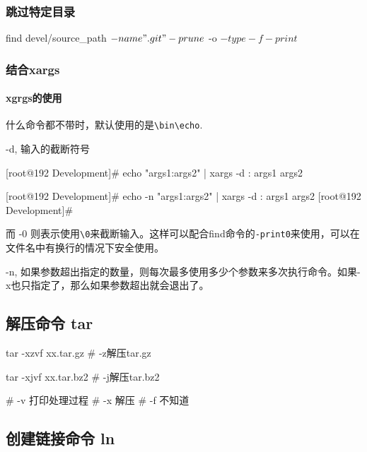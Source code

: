 \subsubsection{跳过特定目录}

\begin{Bash}[]

find devel/source_path \( -name ".git" -prune \) -o \( -type -f -print \)

\end{Bash}

\subsubsection{结合xargs}

\paragraph{xgrgs的使用}

什么命令都不带时，默认使用的是\lstinline$\bin\echo$.

-d, 输入的截断符号

\begin{Bash}

[root@192 Development]# echo "args1:args2" | xargs -d :
args1 args2

[root@192 Development]# echo -n "args1:args2" | xargs -d :
args1 args2
[root@192 Development]# 

\end{Bash}

而 -0 则表示使用\lstinline$\0$来截断输入。这样可以配合find命令的\lstinline$-print0$来使用，可以在文件名中有换行的情况下安全使用。


-n, 如果参数超出指定的数量，则每次最多使用多少个参数来多次执行命令。如果-x也只指定了，那么如果参数超出就会退出了。


\subsection{解压命令 tar}

\begin{Bash}
tar -xzvf xx.tar.gz # -z解压tar.gz

tar -xjvf xx.tar.bz2 # -j解压tar.bz2

# -v 打印处理过程
# -x 解压
# -f 不知道
\end{Bash}




\subsection{创建链接命令 ln}

